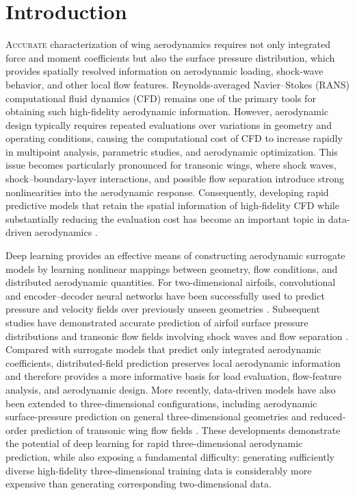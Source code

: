 \section{Introduction}
\label{sec:introduction}

\lettrine{A}{ccurate} characterization of wing aerodynamics requires not only integrated force and moment coefficients but also the surface pressure distribution, which provides spatially resolved information on aerodynamic loading, shock-wave behavior, and other local flow features. Reynolds-averaged Navier--Stokes (RANS) computational fluid dynamics (CFD) remains one of the primary tools for obtaining such high-fidelity aerodynamic information. However, aerodynamic design typically requires repeated evaluations over variations in geometry and operating conditions, causing the computational cost of CFD to increase rapidly in multipoint analysis, parametric studies, and aerodynamic optimization. This issue becomes particularly pronounced for transonic wings, where shock waves, shock--boundary-layer interactions, and possible flow separation introduce strong nonlinearities into the aerodynamic response. Consequently, developing rapid predictive models that retain the spatial information of high-fidelity CFD while substantially reducing the evaluation cost has become an important topic in data-driven aerodynamics \cite{Brunton2020MLFluid}.

Deep learning provides an effective means of constructing aerodynamic surrogate models by learning nonlinear mappings between geometry, flow conditions, and distributed aerodynamic quantities. For two-dimensional airfoils, convolutional and encoder--decoder neural networks have been successfully used to predict pressure and velocity fields over previously unseen geometries \cite{Bhatnagar2019CNNFlow,Thuerey2020DeepRANS}. Subsequent studies have demonstrated accurate prediction of airfoil surface pressure distributions and transonic flow fields involving shock waves and flow separation \cite{Hui2020FastPressure,Duru2022TransonicFlow}. Compared with surrogate models that predict only integrated aerodynamic coefficients, distributed-field prediction preserves local aerodynamic information and therefore provides a more informative basis for load evaluation, flow-feature analysis, and aerodynamic design. More recently, data-driven models have also been extended to three-dimensional configurations, including aerodynamic surface-pressure prediction on general three-dimensional geometries and reduced-order prediction of transonic wing flow fields \cite{Shen2023General3D,Immordino2024TransonicDL}. These developments demonstrate the potential of deep learning for rapid three-dimensional aerodynamic prediction, while also exposing a fundamental difficulty: generating sufficiently diverse high-fidelity three-dimensional training data is considerably more expensive than generating corresponding two-dimensional data.

